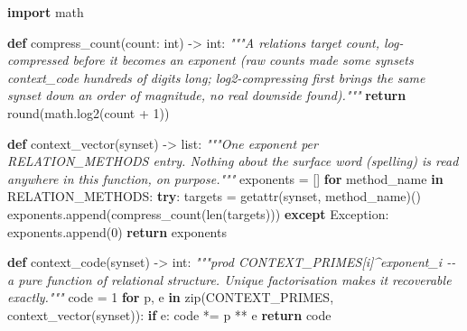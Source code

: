 \documentclass[
  10pt,
]{article}
\newenvironment{Shaded}{}{}
\newcommand{\BuiltInTok}[1]{\textcolor[rgb]{0.00,0.50,0.00}{#1}}
\newcommand{\CommentTok}[1]{\textcolor[rgb]{0.38,0.63,0.69}{\textit{#1}}}
\newcommand{\ControlFlowTok}[1]{\textcolor[rgb]{0.00,0.44,0.13}{\textbf{#1}}}
\newcommand{\DecValTok}[1]{\textcolor[rgb]{0.25,0.63,0.44}{#1}}
\newcommand{\ImportTok}[1]{\textcolor[rgb]{0.00,0.50,0.00}{\textbf{#1}}}
\newcommand{\KeywordTok}[1]{\textcolor[rgb]{0.00,0.44,0.13}{\textbf{#1}}}
\newcommand{\NormalTok}[1]{#1}
\newcommand{\OperatorTok}[1]{\textcolor[rgb]{0.40,0.40,0.40}{#1}}
\newcommand{\PreprocessorTok}[1]{\textcolor[rgb]{0.74,0.48,0.00}{#1}}
\begin{document}
\begin{Shaded}
\begin{Highlighting}[]
\ImportTok{import}\NormalTok{ math}

\KeywordTok{def}\NormalTok{ compress\_count(count: }\BuiltInTok{int}\NormalTok{) }\OperatorTok{{-}\textgreater{}} \BuiltInTok{int}\NormalTok{:}
    \CommentTok{"""A relation\textquotesingle{}s target count, log{-}compressed before it becomes an}
\CommentTok{    exponent (raw counts made some synsets\textquotesingle{} context\_code hundreds of}
\CommentTok{    digits long; log2{-}compressing first brings the same synset down}
\CommentTok{    an order of magnitude, no real downside found)."""}
    \ControlFlowTok{return} \BuiltInTok{round}\NormalTok{(math.log2(count }\OperatorTok{+} \DecValTok{1}\NormalTok{))}

\KeywordTok{def}\NormalTok{ context\_vector(synset) }\OperatorTok{{-}\textgreater{}} \BuiltInTok{list}\NormalTok{:}
    \CommentTok{"""One exponent per RELATION\_METHODS entry. Nothing about the}
\CommentTok{    surface word (spelling) is read anywhere in this function, on purpose."""}
\NormalTok{    exponents }\OperatorTok{=}\NormalTok{ []}
    \ControlFlowTok{for}\NormalTok{ method\_name }\KeywordTok{in}\NormalTok{ RELATION\_METHODS:}
        \ControlFlowTok{try}\NormalTok{:}
\NormalTok{            targets }\OperatorTok{=} \BuiltInTok{getattr}\NormalTok{(synset, method\_name)()}
\NormalTok{            exponents.append(compress\_count(}\BuiltInTok{len}\NormalTok{(targets)))}
        \ControlFlowTok{except} \PreprocessorTok{Exception}\NormalTok{:}
\NormalTok{            exponents.append(}\DecValTok{0}\NormalTok{)}
    \ControlFlowTok{return}\NormalTok{ exponents}

\KeywordTok{def}\NormalTok{ context\_code(synset) }\OperatorTok{{-}\textgreater{}} \BuiltInTok{int}\NormalTok{:}
    \CommentTok{"""prod CONTEXT\_PRIMES[i]\^{}exponent\_i {-}{-} a pure function of relational}
\CommentTok{    structure. Unique factorisation makes it recoverable exactly."""}
\NormalTok{    code }\OperatorTok{=} \DecValTok{1}
    \ControlFlowTok{for}\NormalTok{ p, e }\KeywordTok{in} \BuiltInTok{zip}\NormalTok{(CONTEXT\_PRIMES, context\_vector(synset)):}
        \ControlFlowTok{if}\NormalTok{ e:}
\NormalTok{            code }\OperatorTok{*=}\NormalTok{ p }\OperatorTok{**}\NormalTok{ e}
    \ControlFlowTok{return}\NormalTok{ code}
\end{Highlighting}
\end{Shaded}
\end{document}
